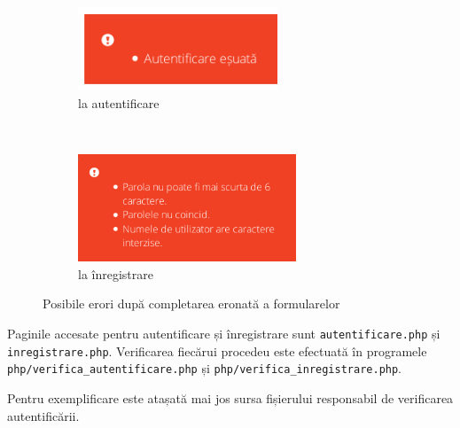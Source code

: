 \documentclass[12pt,a4paper]{article}
\begin{document}
\begin{figure}[h!]
        \centering
        \begin{subfigure}[b]{0.35\textwidth}
                \includegraphics[height=2.5cm]{img/fail1.png}
                \caption{la autentificare}
        \end{subfigure}%
        ~ \qquad 
        \begin{subfigure}[b]{0.55\textwidth}
                \includegraphics[height=3.2cm]{img/fail2.png}
                \caption{la înregistrare}
        \end{subfigure}
        \caption{Posibile erori după completarea eronată a formularelor}%
\end{figure}

Paginile accesate pentru autentificare și înregistrare sunt \texttt{autentificare.php} și
\texttt{inregistrare.php}. Verificarea fiecărui procedeu este efectuată în programele
\texttt{php/verifica\_autentificare.php} și \texttt{php/verifica\_inregistrare.php}.

\vfill

Pentru exemplificare este atașată mai jos sursa fișierului responsabil de verificarea autentificării.
\end{document}
